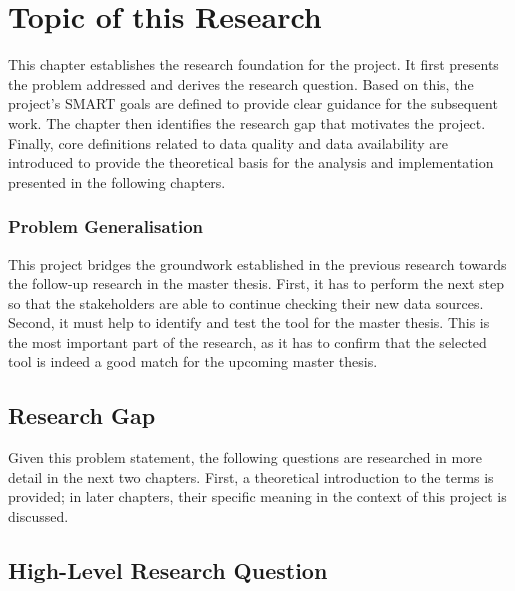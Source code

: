 
\chapter{Topic of this Research}

This chapter establishes the research foundation for the project. It first presents the problem addressed and derives the research question. Based on this, the project's SMART goals are defined to provide clear guidance for the subsequent work. The chapter then identifies the research gap that motivates the project. Finally, core definitions related to data quality and data availability are introduced to provide the theoretical basis for the analysis and implementation presented in the following chapters.







\subsection*{Problem Generalisation}

This project bridges the groundwork established in the previous research towards the follow-up research in the master thesis. First, it has to perform the next step so that the stakeholders are able to continue checking their new data sources. Second, it must help to identify and test the tool for the master thesis. This is the most important part of the research, as it has to confirm that the selected tool is indeed a good match for the upcoming master thesis.



\section{Research Gap}
\label{ResearchResearchGap}

Given this problem statement, the following questions are researched in more detail in the next two chapters. First, a theoretical introduction to the terms is provided; in later chapters, their specific meaning in the context of this project is discussed.



\section{High-Level Research Question}
\label{ResearchResearchQuestion}

